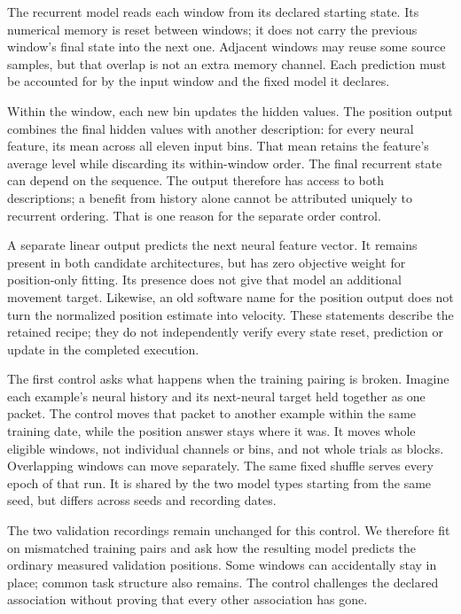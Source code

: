 The recurrent model reads each window from its declared starting state.
Its numerical memory is reset between windows; it does not carry the previous
window's final state into the next one. Adjacent windows may reuse some source
samples, but that overlap is not an extra memory channel. Each prediction
must be accounted for by the input window and the fixed model it declares.

Within the window, each new bin updates the hidden values. The position output
combines the final hidden values with another description: for every neural
feature, its mean across all eleven input bins. That mean retains the feature's
average level while discarding its within-window order. The final recurrent
state can depend on the sequence. The output therefore has access to both
descriptions; a benefit from history alone cannot be attributed uniquely to
recurrent ordering. That is one reason for the separate order control.

A separate linear output predicts the next neural feature vector. It remains
present in both candidate architectures, but has zero objective weight for
position-only fitting. Its presence does not give that model an additional
movement target. Likewise, an old software name for the position output does
not turn the normalized position estimate into velocity. These statements
describe the retained recipe; they do not independently verify every state
reset, prediction or update in the completed execution.

The first control asks what happens when the training pairing is broken.
Imagine each example's neural history and its next-neural target held together
as one packet. The control moves that packet to another example within the
same training date, while the position answer stays where it was. It moves
whole eligible windows, not individual channels or bins, and not whole trials
as blocks. Overlapping windows can move separately. The same fixed shuffle
serves every epoch of that run. It is shared by the two model types starting
from the same seed, but differs across seeds and recording dates.

The two validation recordings remain unchanged for this control. We therefore
fit on mismatched training pairs and ask how the resulting model predicts the
ordinary measured validation positions. Some windows can accidentally stay
in place; common task structure also remains. The control challenges the
declared association without proving that every other association has gone.

